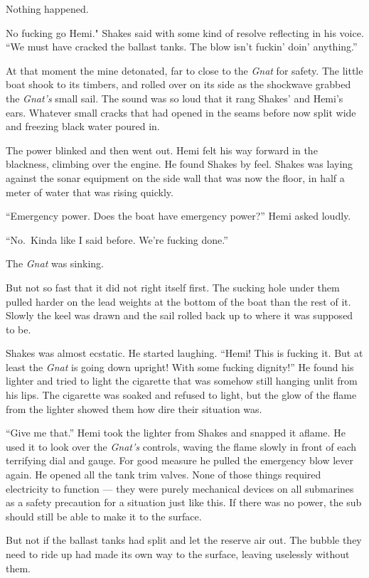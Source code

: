 \documentclass[]{scrbook}
\begin{document}
Nothing happened.

No fucking go Hemi." Shakes said with some kind of resolve reflecting in
his voice. ``We must have cracked the ballast tanks. The blow isn't
fuckin' doin' anything.''

At that moment the mine detonated, far to close to the \emph{Gnat} for
safety. The little boat shook to its timbers, and rolled over on its
side as the shockwave grabbed the \emph{Gnat's} small sail. The sound
was so loud that it rang Shakes' and Hemi's ears. Whatever small cracks
that had opened in the seams before now split wide and freezing black
water poured in.

The power blinked and then went out. Hemi felt his way forward in the
blackness, climbing over the engine. He found Shakes by feel. Shakes was
laying against the sonar equipment on the side wall that was now the
floor, in half a meter of water that was rising quickly.

``Emergency power. Does the boat have emergency power?'' Hemi asked
loudly.

``No.~Kinda like I said before. We're fucking done.''

The \emph{Gnat} was sinking.

But not so fast that it did not right itself first. The sucking hole
under them pulled harder on the lead weights at the bottom of the boat
than the rest of it. Slowly the keel was drawn and the sail rolled back
up to where it was supposed to be.

Shakes was almost ecstatic. He started laughing. ``Hemi! This is fucking
it. But at least the \emph{Gnat} is going down upright! With some
fucking dignity!'' He found his lighter and tried to light the cigarette
that was somehow still hanging unlit from his lips. The cigarette was
soaked and refused to light, but the glow of the flame from the lighter
showed them how dire their situation was.

``Give me that.'' Hemi took the lighter from Shakes and snapped it
aflame. He used it to look over the \emph{Gnat's} controls, waving the
flame slowly in front of each terrifying dial and gauge. For good
measure he pulled the emergency blow lever again. He opened all the tank
trim valves. None of those things required electricity to function ---
they were purely mechanical devices on all submarines as a safety
precaution for a situation just like this. If there was no power, the
sub should still be able to make it to the surface.

But not if the ballast tanks had split and let the reserve air out. The
bubble they need to ride up had made its own way to the surface, leaving
uselessly without them.
\end{document}
